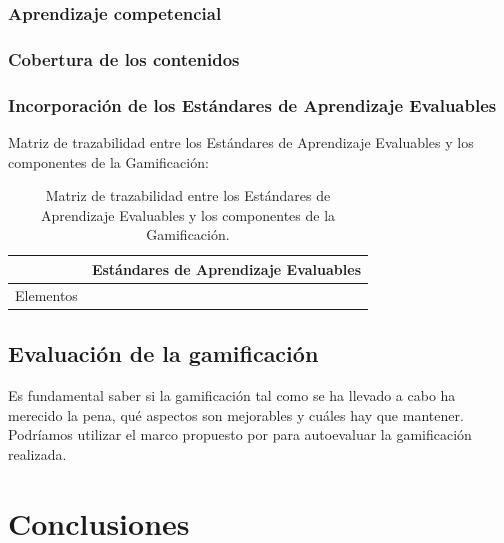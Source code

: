 \documentclass[a4paper, 12pt]{book}
\begin{document}
\subsection{Aprendizaje competencial}
\subsection{Cobertura de los contenidos}
\subsection{Incorporación de los Estándares de Aprendizaje Evaluables}

Matriz de trazabilidad entre los Estándares de Aprendizaje Evaluables y los componentes de la Gamificación:
\begin{table}[hbtp]
\caption{Matriz de trazabilidad entre los Estándares de Aprendizaje Evaluables y los componentes de la Gamificación.}
\label{Trazabilidad}
\begin{tabular}{c|c}
& Estándares de Aprendizaje Evaluables\\\hline
Elementos & \\\hline
\end{tabular}
\end{table}


\section{Evaluación de la gamificación}

Es fundamental saber si la gamificación tal como se ha llevado a cabo ha merecido la pena, qué aspectos son mejorables y cuáles hay que mantener.
%
Podríamos utilizar el marco propuesto por \cite{EvaluacionGamificacion} para autoevaluar la gamificación realizada.



\cleardoublepage
\chapter{Conclusiones}
\label{chap:conclusiones}


\end{document}
